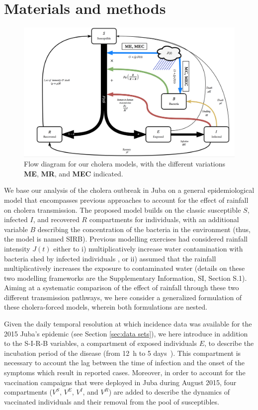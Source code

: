 \section{Materials and methods}
\label{sec:meth}
\begin{figure}
  \centering
  \includegraphics[width=\textwidth]{fig_cholera-rainfall/Lemaitre_ACTROP_2018_42_R1_fig1.png}
  \caption{Flow diagram for our cholera models, with the different variations \textbf{ME}, \textbf{MR}, and \textbf{MEC} indicated.}
  \label{diagram}
\end{figure}

We base our analysis of the cholera outbreak in Juba on a general epidemiological model that encompasses previous approaches to account for the effect of rainfall on cholera transmission. The proposed model builds on the classic susceptible $S$, infected $I$, and recovered $R$ compartments for individuals, with an additional variable $B$ describing the concentration of the bacteria in the environment (thus, the model is named SIRB). Previous modelling exercises had considered rainfall intensity $J(t)$ either to i) multiplicatively increase water contamination with bacteria shed by infected individuals \cite{bertuzzoProbabilityExtinctionHaiti2016,pasettoRealtimeProjectionsCholera2017}, or ii) assumed that the rainfall multiplicatively increases the exposure to contaminated water \cite{eisenbergExaminingRainfallCholera2013} (details on these two modelling frameworks are the Supplementary Information, SI, Section S.1). Aiming at a systematic comparison of the effect of rainfall through these two different transmission pathways, we here consider a generalized formulation of these cholera-forced models, wherein both formulations are nested.

Given the daily temporal resolution at which incidence data was available for the 2015 Juba's epidemic (see Section \ref{sec:data sets}), we here introduce in addition to the S-I-R-B variables, a compartment of exposed individuals $E$, to describe the incubation period of the disease (from 12~h to 5 days~\cite{azman13}). This compartment is necessary to account the lag between the time of infection and the onset of the symptoms which result in reported cases. Moreover, in order to account for the vaccination campaigns that were deployed in Juba during August 2015, four compartments ($V^S$, $V^E$, $V^I$, and $V^R$) are added to describe the dynamics of vaccinated individuals and their removal from the pool of susceptibles.

